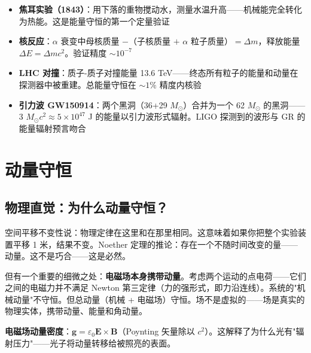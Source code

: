 
\begin{oombox}
  \begin{itemize}
    \item \textbf{焦耳实验（1843）}：用下落的重物搅动水，测量水温升高——机械能完全转化为热能。这是能量守恒的第一个定量验证
    \item \textbf{核反应}：$\alpha$ 衰变中母核质量 $-$（子核质量 $+$ $\alpha$ 粒子质量）$= \Delta m$，释放能量 $\Delta E = \Delta m c^2$。验证精度 $\sim 10^{-7}$
    \item \textbf{LHC 对撞}：质子-质子对撞能量 13.6 TeV——终态所有粒子的能量和动量在探测器中被重建。总能量守恒在 $\sim 1\%$ 精度内核验
    \item \textbf{引力波 GW150914}：两个黑洞（36+29 $M_\odot$）合并为一个 62 $M_\odot$ 的黑洞——3 $M_\odot c^2 \approx 5\times10^{47}$ J 的能量以引力波形式辐射。LIGO 探测到的波形与 GR 的能量辐射预言吻合
  \end{itemize}
\end{oombox}

\section{动量守恒}

\subsection{物理直觉：为什么动量守恒？}

空间平移不变性说：物理定律在这里和在那里相同。这意味着如果你把整个实验装置平移 1 米，结果不变。Noether 定理的推论：存在一个不随时间改变的量——动量。这不是巧合——这是必然。

但有一个重要的细微之处：\textbf{电磁场本身携带动量}。考虑两个运动的点电荷——它们之间的电磁力并不满足 Newton 第三定律（力的强形式，即力沿连线）。系统的"机械动量"不守恒。但总动量（机械 + 电磁场）守恒。场不是虚拟的——场是真实的物理实体，携带动量、能量和角动量。

\textbf{电磁场动量密度}：$\mathbf{g} = \varepsilon_0\mathbf{E}\times\mathbf{B}$（Poynting 矢量除以 $c^2$）。这解释了为什么光有"辐射压力"——光子将动量转移给被照亮的表面。

